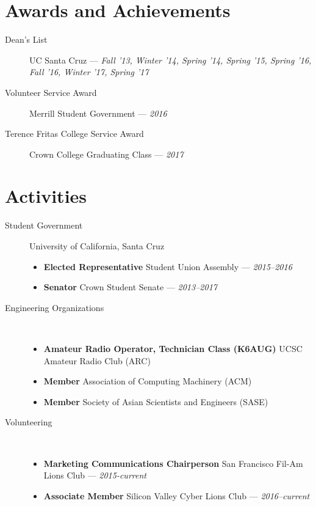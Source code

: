 \documentclass[10pt]{article}
\begin{document}
\section*{Awards and Achievements}
\begin{description}
  \item[Dean's List] UC Santa Cruz --- \textit{Fall '13, Winter '14, Spring '14, Spring '15,
    Spring '16, Fall '16, Winter '17, Spring '17}
  \item[Volunteer Service Award] Merrill Student Government --- \textit{2016}
  \item[Terence Fritas College Service Award] Crown College Graduating Class --- \textit{2017}
\end{description}

\section*{Activities}
\begin{description}
  \item[Student Government] University of California, Santa Cruz
    \begin{itemize}
      \item \textbf{Elected Representative} Student Union Assembly --- \textit{2015--2016}
      \item \textbf{Senator} Crown Student Senate --- \textit{2013--2017}
    \end{itemize}
  \item[Engineering Organizations] ~
    \begin{itemize}
      \item \textbf{Amateur Radio Operator, Technician Class (K6AUG)} UCSC Amateur Radio Club (ARC)
      \item \textbf{Member} Association of Computing Machinery (ACM)
      \item \textbf{Member} Society of Asian Scientists and Engineers (SASE)
    \end{itemize}
  \item[Volunteering] ~
    \begin{itemize}
      \item \textbf{Marketing Communications Chairperson} San Francisco
        Fil-Am Lions Club --- \textit{2015-current}
      \item \textbf{Associate Member} Silicon Valley Cyber Lions Club ---
        \textit{2016--current}
    \end{itemize}
\end{description}
\end{document}
